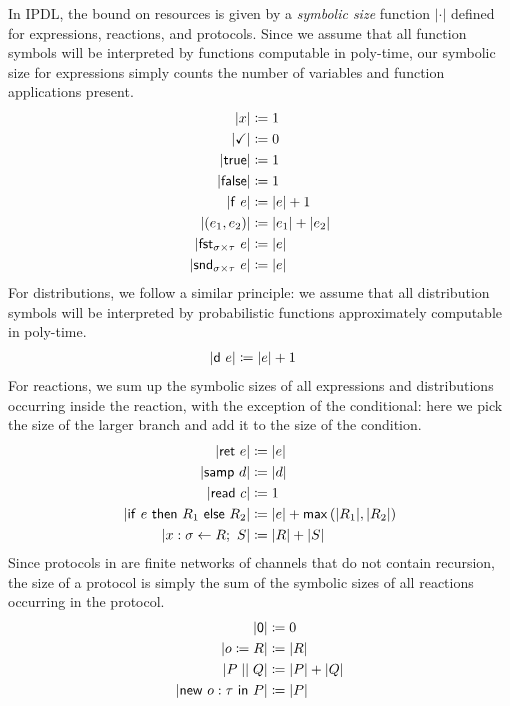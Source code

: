 In \textsf{IPDL}, the bound on resources is given by a \emph{symbolic size} function $|\cdot|$ defined for expressions, reactions, and protocols. Since we assume that all function symbols will be interpreted by  functions computable in poly-time, our symbolic size for expressions simply counts the number of variables and function applications present.
\begin{align*}
|x| & \coloneqq 1 \\
|\checkmark| & \coloneqq 0 \\
|\mathsf{true}| & \coloneqq 1 \\
|\mathsf{false}| & \coloneqq 1 \\
|\mathsf{f} \ e| & \coloneqq |e| + 1 \\
|(e_1, e_2)| & \coloneqq |e_1| + |e_2| \\
|\mathsf{fst}_{\sigma \times \tau} \ e| & \coloneqq |e| \\
|\mathsf{snd}_{\sigma \times \tau} \ e| & \coloneqq |e|
\end{align*}
For distributions, we follow a similar principle: we assume that all distribution symbols will be interpreted by probabilistic functions approximately computable in poly-time.
\begin{align*}
|\mathsf{d} \ e| & \coloneqq |e| + 1
\end{align*}
For reactions, we sum up the symbolic sizes of all expressions and distributions occurring inside the reaction, with the exception of the conditional: here we pick the size of the larger branch and add it to the size of the condition.
\begin{align*}
|\mathsf{ret} \ e| & \coloneqq |e| \\
|\mathsf{samp} \ d| & \coloneqq |d| \\
|\mathsf{read} \ c| & \coloneqq 1 \\
|\mathsf{if} \ e \ \mathsf{then} \ R_1 \ \mathsf{else} \ R_2| & \coloneqq |e| + \mathsf{max} \, (|R_1|, |R_2|) \\
|x : \sigma \leftarrow R; \ S| & \coloneqq |R| + |S|
\end{align*}
Since protocols in \ipdl are finite networks of channels that do not contain recursion, the size of a protocol is simply the sum of the symbolic sizes of all reactions occurring in the protocol.
\begin{align*}
|\mathsf{0}| & \coloneqq 0 \\
|o \coloneqq R| & \coloneqq |R| \\
|P \; || \; Q| & \coloneqq |P| + |Q| \\
|\mathsf{new} \ o : \tau \ \mathsf{in} \ P| & \coloneqq |P|
\end{align*}

